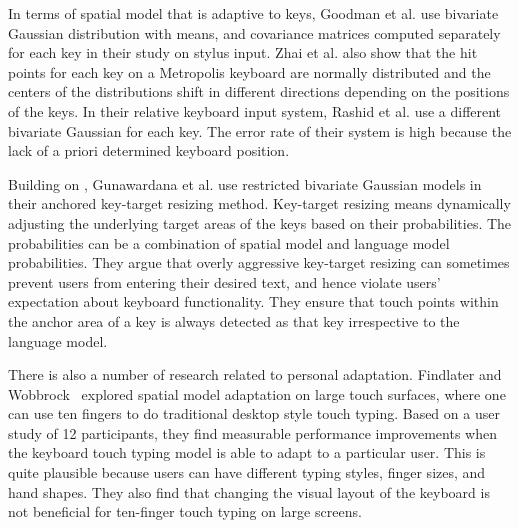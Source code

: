 \documentclass{sigchi}
\begin{document}
In terms of spatial model that is adaptive to keys, Goodman et al. \cite{Goodman:2002} use bivariate Gaussian distribution with means, and
covariance matrices computed separately for each key in their study on stylus input. Zhai et al. \cite{Zhai:2002} also show that
the hit points for each key on a Metropolis keyboard \cite{Zhai:2000} are normally distributed and 
the centers of the distributions shift in different directions depending on the positions of
the keys. In their relative keyboard input system, Rashid et al. \cite{Rashid:2008} use a different bivariate Gaussian for each key. The error rate of their system is high because the lack of 
a priori determined keyboard position.

Building on \cite{Goodman:2002}, Gunawardana et al. \cite{Gunawardana:2010} use restricted bivariate Gaussian
models in their anchored key-target resizing method. Key-target resizing means dynamically
adjusting the underlying target areas of the keys based on their probabilities. The probabilities can 
be a combination of spatial model and language model probabilities.
They argue that overly aggressive
key-target resizing can sometimes prevent users from entering their desired text, and hence violate
users' expectation about keyboard functionality. They ensure that touch points within
the anchor area of a key is always detected as that key irrespective to the language model.

There is also a number of research related to personal adaptation. Findlater and
Wobbrock~\cite{Findlater:2012} explored spatial model adaptation on large touch 
surfaces, where one can use ten fingers to do traditional desktop style touch 
typing. Based on a user study of 12 participants, they find measurable
performance improvements when the keyboard touch typing model is able to adapt to a particular user. This is quite plausible because users can have different typing styles, finger sizes, and hand shapes. They also find that changing the visual layout of the keyboard is not beneficial for ten-finger touch typing on large screens.
\end{document}
